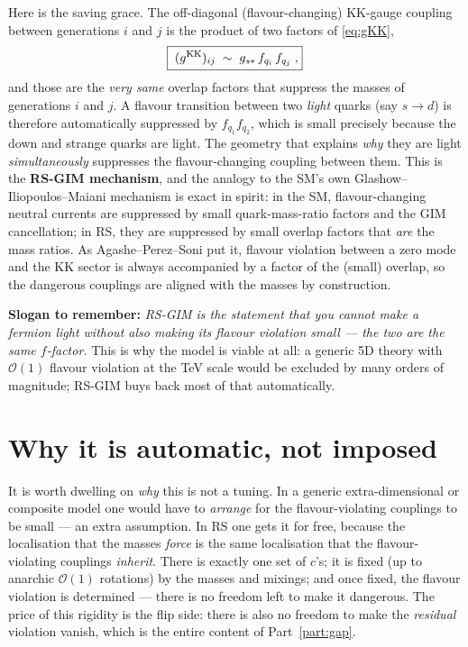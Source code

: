 \documentclass[11pt]{article}
\newcommand{\gss}{g_{s*}}
\theoremstyle{definition}
\begin{document}
Here is the saving grace. The off-diagonal (flavour-changing) KK-gauge coupling
between generations $i$ and $j$ is the product of two factors of \eqref{eq:gKK},
\begin{equation}
\boxed{\;(g^{\rm KK})_{ij}\;\sim\;\gss\,f_{q_i}\,f_{q_j}\;,}
\label{eq:rsgim}
\end{equation}
and those are the \emph{very same} overlap factors that suppress the masses of
generations $i$ and $j$. A flavour transition between two \emph{light} quarks
(say $s\to d$) is therefore automatically suppressed by $f_{q_1}f_{q_2}$, which is
small precisely because the down and strange quarks are light. The geometry that
explains \emph{why} they are light \emph{simultaneously} suppresses the
flavour-changing coupling between them. This is the \textbf{RS-GIM mechanism}, and
the analogy to the SM's own Glashow--Iliopoulos--Maiani mechanism is exact in
spirit: in the SM, flavour-changing neutral currents are suppressed by small
quark-mass-ratio factors and the GIM cancellation; in RS, they are suppressed by
small overlap factors that \emph{are} the mass ratios. As Agashe--Perez--Soni put
it, flavour violation between a zero mode and the KK sector is always accompanied
by a factor of the (small) overlap, so the dangerous couplings are aligned with the
masses by construction.

\textbf{Slogan to remember:} \emph{RS-GIM is the statement that you cannot make a
fermion light without also making its flavour violation small --- the two are the
same $f$-factor.} This is why the model is viable at all: a generic 5D theory with
$\mathcal{O}(1)$ flavour violation at the TeV scale would be excluded by
many orders of magnitude; RS-GIM buys back most of that automatically.

\section{Why it is automatic, not imposed}
\label{sec:automatic}

It is worth dwelling on \emph{why} this is not a tuning. In a generic
extra-dimensional or composite model one would have to \emph{arrange} for the
flavour-violating couplings to be small --- an extra assumption. In RS one gets it
for free, because the localisation that the masses \emph{force} is the same
localisation that the flavour-violating couplings \emph{inherit}. There is exactly
one set of $c$'s; it is fixed (up to anarchic $\mathcal{O}(1)$ rotations) by the
masses and mixings; and once fixed, the flavour violation is determined --- there
is no freedom left to make it dangerous. The price of this rigidity is the flip
side: there is also no freedom to make the \emph{residual} violation vanish, which
is the entire content of Part~\ref{part:gap}.
\end{document}
